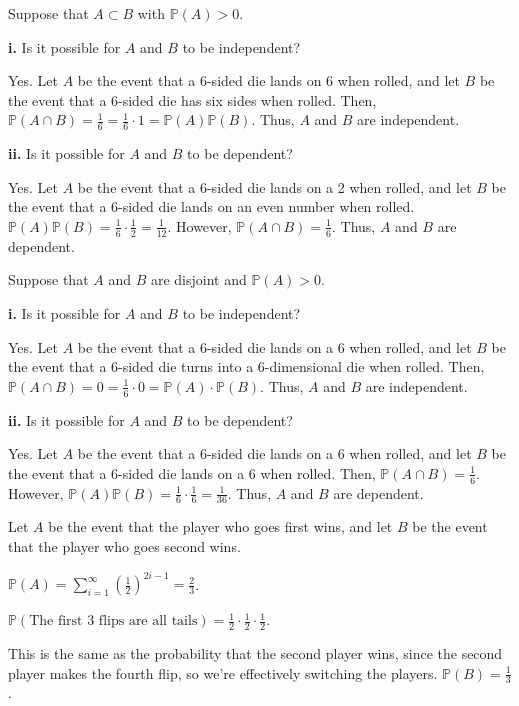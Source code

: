 \documentclass[12pt]{article}
\begin{document}
 Suppose that $A \subset B$ with $\mathbb P(A) > 0$.

{\bf i.} Is it possible for $A$ and $B$ to be independent?

    Yes. Let $A$ be the event that a 6-sided die lands on 6 when rolled, and let $B$ be the event that a 6-sided die has six sides when rolled. Then, $\mathbb P(A \cap B) = \frac16 = \frac16 \cdot 1 = \mathbb P(A) \mathbb P(B)$. Thus, $A$ and $B$ are independent.

\medskip
{\bf ii.} Is it possible for $A$ and $B$ to be dependent?

    Yes. Let $A$ be the event that a 6-sided die lands on a 2 when rolled, and let $B$ be the event that a 6-sided die lands on an even number when rolled. $\mathbb P(A) \mathbb P(B) = \frac16 \cdot \frac12 = \frac1{12}$. However, $\mathbb P(A \cap B) = \frac16$. Thus, $A$ and $B$ are dependent.

\bigskip
{} Suppose that $A$ and $B$ are disjoint and $\mathbb P(A) > 0$.

{\bf i.} Is it possible for $A$ and $B$ to be independent?

    Yes. Let $A$ be the event that a 6-sided die lands on a 6 when rolled, and let $B$ be the event that a 6-sided die turns into a 6-dimensional die when rolled. Then, $\mathbb P(A \cap B) = 0 = \frac16 \cdot 0 = \mathbb P(A) \cdot \mathbb P(B)$. Thus, $A$ and $B$ are independent.

\medskip
{\bf ii.} Is it possible for $A$ and $B$ to be dependent?

    Yes. Let $A$ be the event that a 6-sided die lands on a 6 when rolled, and let $B$ be the event that a 6-sided die lands on a 6 when rolled. Then, $\mathbb P(A \cap B) = \frac16$. However, $\mathbb P(A) \mathbb P(B) = \frac16 \cdot \frac16 = \frac1{36}$. Thus, $A$ and $B$ are dependent.

\newpage
{} Let $A$ be the event that the player who goes first wins, and let $B$ be the event that the player who goes second wins.

 $\mathbb P(A) = \sum_{i=1}^\infty (\frac{1}{2})^{2i-1} = \frac23$.

\medskip
{} $\mathbb P(\text{The first 3 flips are all tails}) =  \frac12 \cdot \frac12 \cdot \frac12$.

\medskip
{} This is the same as the probability that the second player wins, since the second player makes the fourth flip, so we're effectively switching the players. $\mathbb P(B) = \frac13$.
\end{document}
